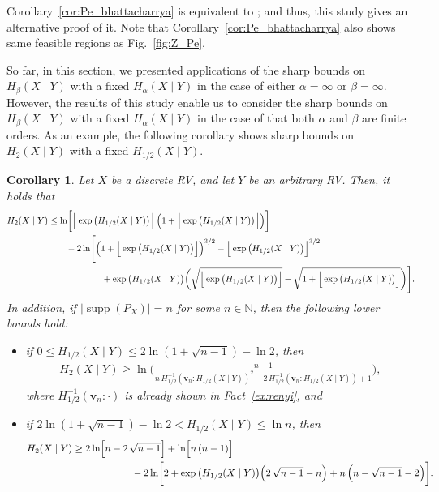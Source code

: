 \documentclass[conference, draftcls, onecolumn]{IEEEtran}
\theoremstyle{plain}
\newtheorem{corollary}{Corollary}
\newcommand{\bvec}[1]{\boldsymbol{#1}}
\newcommand{\supp}{\operatorname{supp}}
\newcommand{\figref}[1]{Fig.~\ref{#1}}
\newcommand{\factref}[1]{Fact~\ref{#1}}
\newcommand{\corref}[1]{Corollary~\ref{#1}}
\begin{document}
\corref{cor:Pe_bhattacharrya} is equivalent to \cite[Lemma~22]{mori}; and thus, this study gives an alternative proof of it.
Note that \corref{cor:Pe_bhattacharrya} also shows same feasible regions as \figref{fig:Z_Pe}.


So far, in this section, we presented applications of the sharp bounds on $H_{\beta}(X \mid Y)$ with a fixed $H_{\alpha}(X \mid Y)$ in the case of either $\alpha = \infty$ or $\beta = \infty$.
However, the results of this study enable us to consider the sharp bounds on $H_{\beta}(X \mid Y)$ with a fixed $H_{\alpha}(X \mid Y)$ in the case of that both $\alpha$ and $\beta$ are finite orders.
As an example, the following corollary shows sharp bounds on $H_{2}(X \mid Y)$ with a fixed $H_{1/2}(X \mid Y)$.


\begin{corollary}
\label{cor:2_half}
Let $X$ be a discrete RV, and let $Y$ be an arbitrary RV.
Then, it holds that
\begin{align}
H_{2}(X \mid Y)
& \le
\ln \! \bigg[ \Big\lfloor \exp \big( H_{1/2}(X \mid Y) \big) \Big\rfloor \, \Big( 1 + \Big\lfloor \exp \big( H_{1/2}(X \mid Y) \big) \Big\rfloor \Big) \bigg]
\notag \\
& \qquad
- 2 \ln \! \Bigg[ \Big( 1 + \Big\lfloor \exp \big( H_{1/2}(X \mid Y) \big) \Big\rfloor \Big)^{3/2} - \Big\lfloor \exp \big( H_{1/2}(X \mid Y) \big) \Big\rfloor^{3/2}
\notag \\
& \qquad \qquad \qquad
+ \exp\big( H_{1/2}(X \mid Y) \big) \bigg( \sqrt{ \Big\lfloor \exp \big( H_{1/2}(X \mid Y) \big) \Big\rfloor } - \sqrt{ 1 + \Big\lfloor \exp \big( H_{1/2}(X \mid Y) \big) \Big\rfloor } \bigg) \Bigg] .
\label{eq:2_half_UB}
\end{align}
In addition, if $|\!\supp( P_{X} )| = n$ for some $n \in \mathbb{N}$, then the following lower bounds hold:
\begin{itemize}
\item
if $0 \le H_{1/2}(X \mid Y) \le 2 \ln (1 + \sqrt{n-1}) - \ln 2$, then
\begin{align}
H_{2}(X \mid Y)
\ge
\ln \Bigg( \frac{ n - 1 }{ n \, H_{1/2}^{-1}( \bvec{v}_{n} : H_{1/2}(X \mid Y) )^{2} - 2 \, H_{1/2}^{-1}( \bvec{v}_{n} : H_{1/2}(X \mid Y) ) + 1 } \Bigg) ,
\label{eq:2_half_LB1}
\end{align}
where $H_{1/2}^{-1}( \bvec{v}_{n} : \cdot )$ is already shown in \factref{ex:renyi}, and
\item
if $2 \ln (1 + \sqrt{n-1}) - \ln 2 < H_{1/2}(X \mid Y) \le \ln n$, then
\begin{align}
H_{2}(X \mid Y)
& \ge
2 \ln \! \Big[ n - 2 \, \sqrt{n-1} \Big] + \ln \! \Big[ n \, (n - 1) \Big]
\notag \\
& \qquad \qquad \qquad
- 2 \ln \! \bigg[ 2 + \exp\big( H_{1/2}(X \mid Y) \big) \Big( 2 \, \sqrt{ n - 1 } - n \Big) + n \, \Big( n - \sqrt{ n - 1 } - 2 \Big) \bigg] .
\label{eq:2_half_LB2}
\end{align}
\end{itemize}
\end{corollary}
\end{document}
